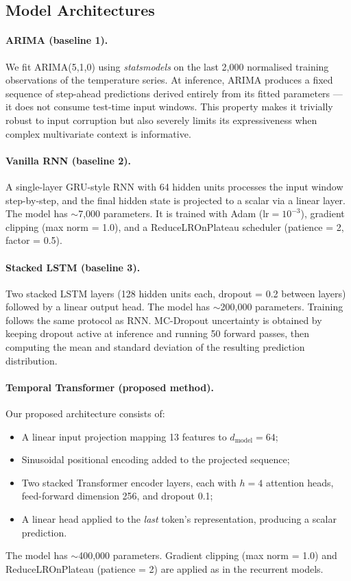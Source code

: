 \documentclass[runningheads]{llncs}
\begin{document}
\subsection{Model Architectures}
\label{sec:models}

\paragraph{ARIMA (baseline 1).}
We fit ARIMA(5,1,0) using \textit{statsmodels} on the last 2,000 normalised training observations of the temperature series. At inference, ARIMA produces a fixed sequence of step-ahead predictions derived entirely from its fitted parameters — it does not consume test-time input windows. This property makes it trivially robust to input corruption but also severely limits its expressiveness when complex multivariate context is informative.

\paragraph{Vanilla RNN (baseline 2).}
A single-layer GRU-style RNN with 64 hidden units processes the input window step-by-step, and the final hidden state is projected to a scalar via a linear layer. The model has $\sim$7,000 parameters. It is trained with Adam ($\text{lr}=10^{-3}$), gradient clipping (max norm = 1.0), and a ReduceLROnPlateau scheduler (patience = 2, factor = 0.5).

\paragraph{Stacked LSTM (baseline 3).}
Two stacked LSTM layers (128 hidden units each, dropout = 0.2 between layers) followed by a linear output head. The model has $\sim$200,000 parameters. Training follows the same protocol as RNN. MC-Dropout uncertainty is obtained by keeping dropout active at inference and running 50 forward passes, then computing the mean and standard deviation of the resulting prediction distribution.

\paragraph{Temporal Transformer (proposed method).}
Our proposed architecture consists of:
\begin{itemize}
  \item A linear input projection mapping 13 features to $d_\text{model} = 64$;
  \item Sinusoidal positional encoding \cite{vaswani2017attention} added to the projected sequence;
  \item Two stacked Transformer encoder layers, each with $h = 4$ attention heads, feed-forward dimension 256, and dropout 0.1;
  \item A linear head applied to the \emph{last} token's representation, producing a scalar prediction.
\end{itemize}
The model has $\sim$400,000 parameters. Gradient clipping (max norm = 1.0) and ReduceLROnPlateau (patience = 2) are applied as in the recurrent models.
\end{document}
